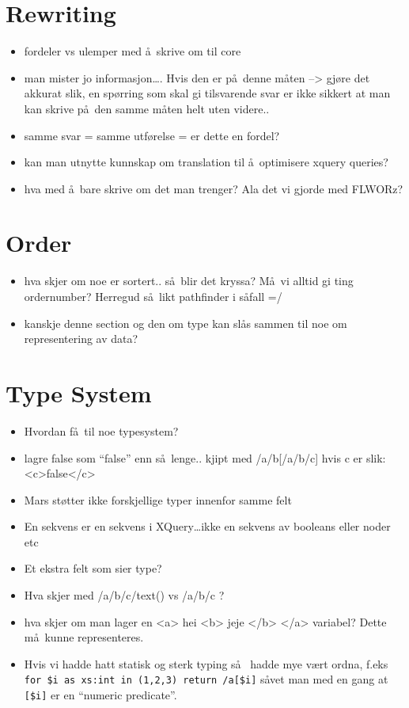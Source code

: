 \section{Rewriting}
\label{sect:discussion:rewriting}
\begin{itemize}
  \item fordeler vs ulemper med \aa~skrive om til core
  \item man mister jo informasjon\ldots. Hvis den er p\aa~denne m\aa ten --> gj\o re det akkurat
	  slik, en sp\o rring som skal gi tilsvarende svar er ikke sikkert at man kan
	  skrive p\aa~den samme m\aa ten helt uten videre..  
  \item samme svar = samme utf\o relse = er dette en fordel?
  \item kan man utnytte kunnskap om translation til \aa~optimisere xquery queries?
  \item hva med \aa~bare skrive om det man trenger? Ala det vi gjorde med FLWORz?
\end{itemize}





\section{Order}
\label{sect:discussion:order}
\begin{itemize}
  \item hva skjer om noe er sortert.. s\aa~blir det kryssa? M\aa~vi alltid gi ting ordernumber? Herregud s\aa~likt
  pathfinder i s\aa fall =/
  \item kanskje denne section og den om type kan sl\aa s sammen til noe om representering av data?
\end{itemize}

\section{Type System}
\label{sect:discussion:typeSystem}
\begin{itemize}
  \item Hvordan f\aa~til noe typesystem?
  \item lagre false som ``false'' enn s\aa~lenge.. kjipt med /a/b[/a/b/c] hvis c er slik: <c>false</c>
  \item Mars st\o tter ikke forskjellige typer innenfor samme felt
  \item En sekvens er en sekvens i XQuery\ldots ikke en sekvens av booleans
  eller noder etc
  \item Et ekstra felt som sier type?
  \item Hva skjer med /a/b/c/text() vs /a/b/c ?
  \item hva skjer om man lager en <a> hei <b> jeje </b> </a> variabel? Dette
  m\aa~kunne representeres.
  \item Hvis vi hadde hatt statisk og sterk typing s\aa~ hadde mye v\ae rt
  ordna, f.eks \verb!for $i as xs:int in (1,2,3) return /a[$i]! s\aa vet man
  med en gang at \verb![$i]! er en ``numeric predicate''.
\end{itemize}

